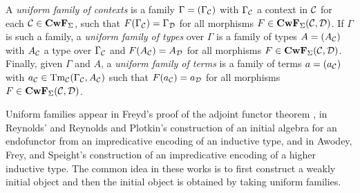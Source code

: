 \documentclass{mscs}
\def\D{\mathcal{D}}
\def\Cwf{\mathbf{CwF}}
\begin{document}
A {\em uniform family of contexts} is a family $\Gamma = (\Gamma_{{\mathcal C}})$ with $\Gamma_{\mathcal C}$ a context in
${\mathcal C}$ for each $\C \in \Cwf_{\Sigma}$, such that
$F(\Gamma_\C) = \Gamma_\D$ for all morphisms $F \in \Cwf_{\Sigma}(\C,\D)$.
If $\Gamma$ is such a family, a {\em uniform family of types} over $\Gamma$ is a
family of types $A = (A_{{\mathcal C}})$ with $A_{{\mathcal C}}$ a type over $\Gamma_{{\mathcal C}}$ and
$F(A_{\C}) = A_{\D}$ for all morphisms $F \in \Cwf_{\Sigma}(\C,\D)$.
Finally, given $\Gamma$ and $A$, a {\em uniform family of terms} is a family
of terms $a = (a_{{\mathcal C}})$ with $a_{\mathcal C} \in \mathrm{Tm}_{{\mathcal C}}(\Gamma_{{\mathcal C}},A_{{\mathcal C}})$ such that
$F(a_{\C}) = a_{\D}$ for all morphisms $F \in \Cwf_{\Sigma}(\C,\D)$.

\begin{remark}
Uniform families appear in Freyd's proof of the adjoint functor theorem \cite{freyd:abelian}, in Reynolds' \cite{reynolds:impredicative} and Reynolds and Plotkin's construction \cite{plotkin-reynolds} of an initial algebra for an endofunctor from an impredicative encoding of an inductive type, and in Awodey, Frey, and Speight's  \cite{awodey:impredicative} construction of an impredicative encoding of a higher inductive type. The common idea in these works is to first construct a weakly initial object and then the initial object is obtained by taking uniform families.
\end{remark}
\end{document}
